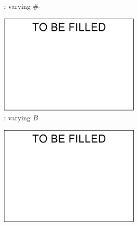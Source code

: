 {\begin{figure}[tb!]
\begin{subfigure}[b]{1.00\textwidth}
\begin{subfigure}[b]{0.245\textwidth}
          \begin{center}
            \vspace{-2ex}\caption{\tpcds: varying \#-}
            \label{tpcds-1-vary-join} 
          \end{center}
          \vspace{-1ex}
        \end{subfigure}
  		\begin{subfigure}[b]{0.245\textwidth}
          \centering
          \includegraphics[width=1\textwidth]{fig/a.eps}
          \begin{center}
            \vspace{-2ex}\caption{\tpcds: varying $B$}
            \label{tpcds-1-varyB} 
          \end{center}
          \vspace{-1ex}
        \end{subfigure}
  		\begin{subfigure}[b]{0.245\textwidth}
          \centering
          \includegraphics[width=1\textwidth]{fig/a.eps}

\end{subfigure}
\end{subfigure}
\end{figure}}
